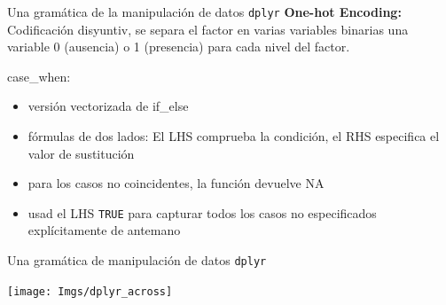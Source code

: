 \documentclass[
  ignorenonframetext,
  aspectratio=169]{beamer}
\providecommand{\tightlist}{%
  \setlength{\itemsep}{0pt}\setlength{\parskip}{0pt}}
\begin{document}
\begin{frame}[fragile]{Una gramática de la manipulación de datos
\texttt{dplyr}}
\label{una-gramuxe1tica-de-la-manipulaciuxf3n-de-datos-dplyr-25}
\textbf{One-hot Encoding:} Codificación disyuntiv, se separa el factor
en varias variables binarias una variable 0 (ausencia) o 1 (presencia)
para cada nivel del factor.

case\_when:

\begin{itemize}
\tightlist
\item
  versión vectorizada de if\_else
\item
  fórmulas de dos lados: El LHS comprueba la condición, el RHS
  especifica el valor de sustitución
\item
  para los casos no coincidentes, la función devuelve NA
\item
  usad el LHS \texttt{TRUE} para capturar todos los casos no
  especificados explícitamente de antemano
\end{itemize}
\end{frame}

\begin{frame}{Una gramática de manipulación de datos \texttt{dplyr}}
\label{una-gramuxe1tica-de-manipulaciuxf3n-de-datos-dplyr-4}
\begin{center}\texttt{[image: Imgs/dplyr\_across]} \end{center}
\end{frame}
\end{document}
